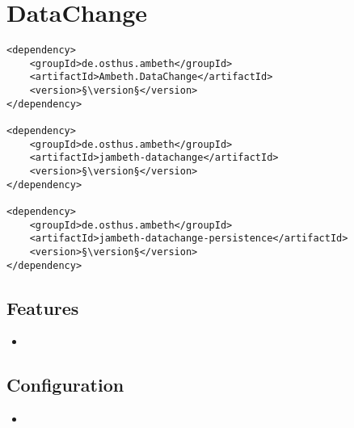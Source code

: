\section{DataChange}
\label{module:DataChange}
\ClearAPI
\TODO
\begin{lstlisting}[style=POM,caption={Maven modules to use \emph{Ambeth DataChange}}]
<dependency>
	<groupId>de.osthus.ambeth</groupId>
	<artifactId>Ambeth.DataChange</artifactId>
	<version>§\version§</version>
</dependency>

<dependency>
	<groupId>de.osthus.ambeth</groupId>
	<artifactId>jambeth-datachange</artifactId>
	<version>§\version§</version>
</dependency>

<dependency>
	<groupId>de.osthus.ambeth</groupId>
	<artifactId>jambeth-datachange-persistence</artifactId>
	<version>§\version§</version>
</dependency>
\end{lstlisting}
\subsection{Features}
\begin{itemize}
	\item {}
\end{itemize}

\subsection{Configuration}
\begin{itemize}
	\item {}
\end{itemize}
